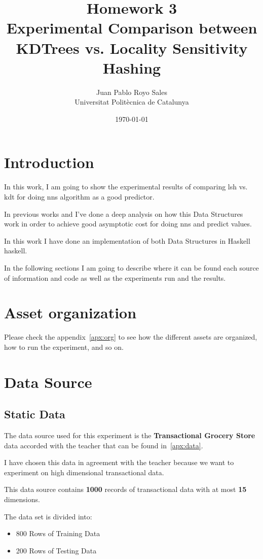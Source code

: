 \documentclass[12pt, a4paper]{article}
\title{%
      Homework 3 \\
      Experimental Comparison between KDTrees vs. Locality Sensitivity Hashing
}
\author{%
  Juan Pablo Royo Sales \\
  \small{Universitat Politècnica de Catalunya}
}
\date\today
\begin{document}
\maketitle

\section{Introduction}\label{sec:intro}
In this work, I am going to show the experimental results of comparing \acrfull{lsh} vs. \acrfull{kdt} for doing \acrfull{nns} algorithm as a good predictor.

In previous works \cite{hmw1} and \cite{hmw2} I've done a deep analysis on how this Data Structures work in order to achieve good asymptotic cost for doing \acrshort{nns} and predict values.

In this work I have done an implementation of both Data Structures in Haskell \acrfull{haskell}.

In the following sections I am going to describe where it can be found each source of information and code as well as the experiments run and the results.

\section{Asset organization}
Please check the appendix~\ref{apx:org} to see how the different assets are organized, how to run the experiment, and so on.

\section{Data Source}
\subsection{Static Data}
The data source used for this experiment is the \textbf{Transactional Grocery Store} data accorded with the teacher that can be found in~\ref{apx:data}.

I have chosen this data in agreement with the teacher because we want to experiment on high dimensional transactional data.

This data source contains \textbf{1000} records of transactional data with at most \textbf{15} dimensions.

The data set is divided into:

\begin{itemize}
  \item 800 Rows of Training Data
  \item 200 Rows of Testing Data
\end{itemize}
\end{document}
